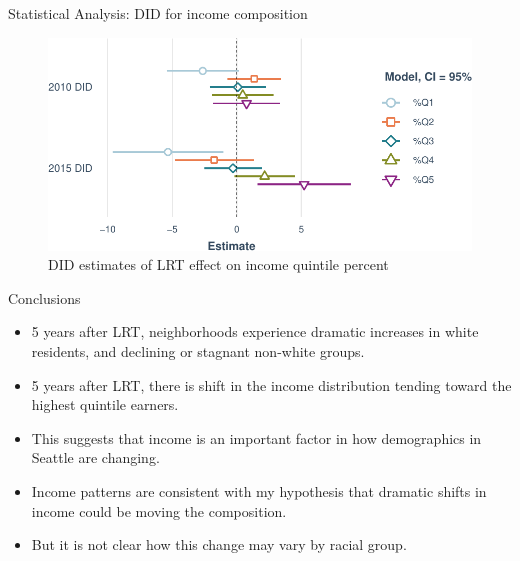 \documentclass[11pt,ignorenonframetext,]{beamer}
\providecommand{\tightlist}{%
  \setlength{\itemsep}{0pt}\setlength{\parskip}{0pt}}
\begin{document}
\begin{frame}{Statistical Analysis: DID for income composition}
\protect\hypertarget{statistical-analysis-did-for-income-composition}{}

\begin{figure}
\centering
\includegraphics{csde_talk_files/figure-beamer/unnamed-chunk-11-1.pdf}
\caption{DID estimates of LRT effect on income quintile percent}
\end{figure}

\end{frame}

\begin{frame}{Conclusions}
\protect\hypertarget{conclusions}{}

\begin{itemize}
\tightlist
\item
  5 years after LRT, neighborhoods experience dramatic increases in
  white residents, and declining or stagnant non-white groups.
\item
  5 years after LRT, there is shift in the income distribution tending
  toward the highest quintile earners.\\
\item
  This suggests that income is an important factor in how demographics
  in Seattle are changing.
\item
  Income patterns are consistent with my hypothesis that dramatic shifts
  in income could be moving the composition.
\item
  But it is not clear how this change may vary by racial group.
\end{itemize}

\end{frame}
\end{document}
